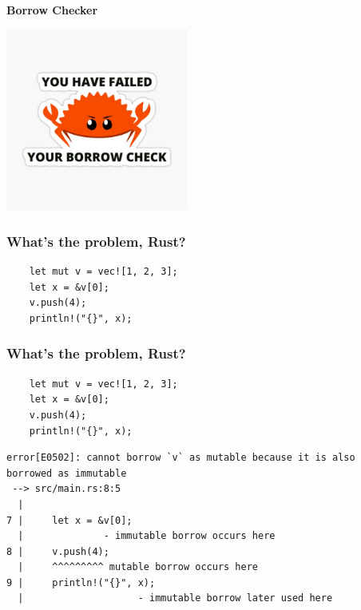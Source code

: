 \documentclass[aspectratio=1610,t]{beamer}
\begin{document}

\begin{frame}
\center\Huge\textbf{Borrow Checker}

\includegraphics[height=6cm,keepaspectratio]{images/check-failed.jpeg}
\end{frame}


\begin{frame}[fragile]
\frametitle{What's the problem, Rust?}
\begin{verbatim}
    let mut v = vec![1, 2, 3];
    let x = &v[0];
    v.push(4);
    println!("{}", x);
\end{verbatim}
\end{frame}


\begin{frame}[fragile]
\frametitle{What's the problem, Rust?}
\begin{verbatim}
    let mut v = vec![1, 2, 3];
    let x = &v[0];
    v.push(4);
    println!("{}", x);
\end{verbatim}

\begin{verbatim}
error[E0502]: cannot borrow `v` as mutable because it is also
borrowed as immutable
 --> src/main.rs:8:5
  |
7 |     let x = &v[0];
  |              - immutable borrow occurs here
8 |     v.push(4);
  |     ^^^^^^^^^ mutable borrow occurs here
9 |     println!("{}", x);
  |                    - immutable borrow later used here
\end{verbatim}
\end{frame}

\end{document}
